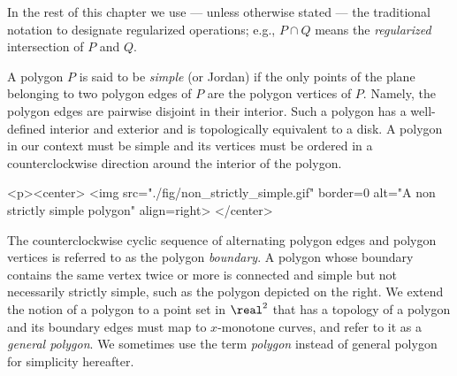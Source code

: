 In the rest of this chapter we use --- unless otherwise stated --- the
traditional notation to designate regularized operations; e.g., $P \cap Q$
means the {\em regularized} intersection of $P$ and $Q$.

A polygon $P$ is said to be {\em simple} (or Jordan) if the only
points of the plane belonging to two polygon edges of $P$ are the
polygon vertices of $P$. Namely, the polygon edges are pairwise
disjoint in their interior. Such a polygon has a well-defined interior
and exterior and is topologically equivalent to a disk. A polygon in our
context must be simple and its vertices must be ordered in a
counterclockwise direction around the interior of the polygon.
 
\lcTex{%
  \setlength{\BooleanSetOpsWidthRight}{1.4cm}
  \setlength{\BooleanSetOpsWidthLeft}{\BooleanSetOpsWidthLineReal}
  \addtolength{\BooleanSetOpsWidthLeft}{-\BooleanSetOpsWidthRight}
  \begin{minipage}{\BooleanSetOpsWidthLeft}
}
\label{fig:non_strictly_simple_polygon}
\begin{ccHtmlOnly}
  <p><center>
    <img src="./fig/non_strictly_simple.gif" border=0 alt="A non strictly simple polygon" align=right>
  </center>
\end{ccHtmlOnly}
The counterclockwise cyclic sequence of alternating polygon edges and
polygon vertices is referred to as the polygon {\em boundary}.
A polygon whose boundary contains the same vertex twice or more is connected
and simple but not necessarily strictly simple, such as the polygon depicted
on the right.  We extend the notion of a polygon to a point set in $\real^2$
that has  a topology of a polygon and its boundary edges must map to
$x$-monotone curves, and refer to it as a {\em general polygon}. We
sometimes use the term {\em polygon} instead of general polygon for
simplicity hereafter.

